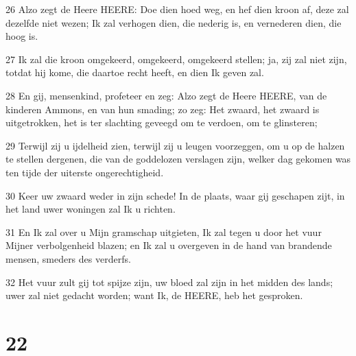 \par 26 Alzo zegt de Heere HEERE: Doe dien hoed weg, en hef dien kroon af, deze zal dezelfde niet wezen; Ik zal verhogen dien, die nederig is, en vernederen dien, die hoog is.
\par 27 Ik zal die kroon omgekeerd, omgekeerd, omgekeerd stellen; ja, zij zal niet zijn, totdat hij kome, die daartoe recht heeft, en dien Ik geven zal.
\par 28 En gij, mensenkind, profeteer en zeg: Alzo zegt de Heere HEERE, van de kinderen Ammons, en van hun smading; zo zeg: Het zwaard, het zwaard is uitgetrokken, het is ter slachting geveegd om te verdoen, om te glinsteren;
\par 29 Terwijl zij u ijdelheid zien, terwijl zij u leugen voorzeggen, om u op de halzen te stellen dergenen, die van de goddelozen verslagen zijn, welker dag gekomen was ten tijde der uiterste ongerechtigheid.
\par 30 Keer uw zwaard weder in zijn schede! In de plaats, waar gij geschapen zijt, in het land uwer woningen zal Ik u richten.
\par 31 En Ik zal over u Mijn gramschap uitgieten, Ik zal tegen u door het vuur Mijner verbolgenheid blazen; en Ik zal u overgeven in de hand van brandende mensen, smeders des verderfs.
\par 32 Het vuur zult gij tot spijze zijn, uw bloed zal zijn in het midden des lands; uwer zal niet gedacht worden; want Ik, de HEERE, heb het gesproken.

\chapter{22}

